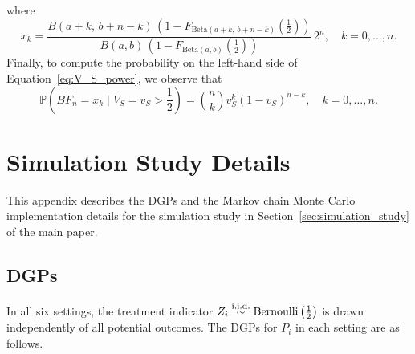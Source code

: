 \documentclass[referee,usenatbib]{biom}
\newcommand{\iid}{\overset{\text{\footnotesize i.i.d.}}{\sim}}
\begin{document}
where
\begin{equation*}
    x_{k} = \frac{B(a + k,\, b + n - k) \, \left(1 - F_{\mathrm{Beta}(a+k,\, b+n-k)}\!\left(\tfrac{1}{2}\right)\right)}{B(a,b) \, \left(1 - F_{\mathrm{Beta}(a,b)}\!\left(\tfrac{1}{2}\right)\right)} \, 2^{n}, \quad k = 0, \ldots, n.
\end{equation*}
Finally, to compute the probability on the left-hand side of Equation~\eqref{eq:V_S_power}, we observe that
\begin{equation*}
    \mathbb{P} \left( BF_{n} = x_{k} \mid V_{S} = v_{S} > \frac{1}{2} \right) = \binom{n}{k} v_{S}^{k}(1-v_{S})^{n-k}, \quad k = 0, \ldots, n.
\end{equation*}

\section{Simulation Study Details}
\label{app:simulation_details}

This appendix describes the DGPs and the Markov chain Monte Carlo implementation details for the simulation study in Section~\ref{sec:simulation_study} of the main paper.

\subsection{DGPs}
\label{app:data_generating_processes}

In all six settings, the treatment indicator \(Z_i \iid \text{Bernoulli}\left(\frac{1}{2}\right)\) is drawn independently of all potential outcomes. The DGPs for \(P_i\) in each setting are as follows.
\end{document}
